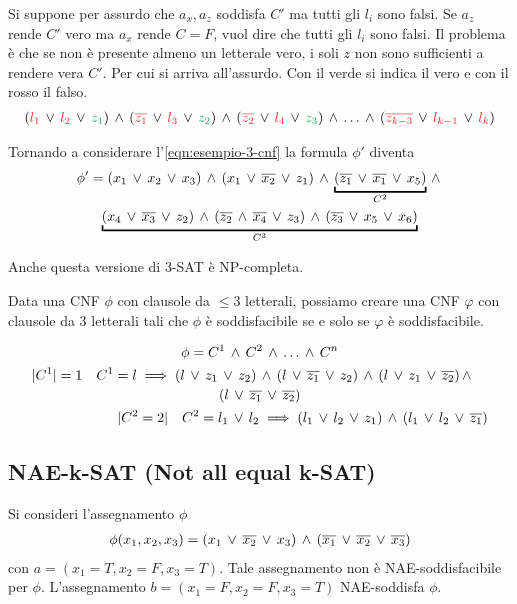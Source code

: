 Si suppone per assurdo che $a_x, a_z$ soddisfa $C'$ ma tutti gli $l_i$ sono falsi. Se $a_z$ rende $C'$ vero ma $a_x$ rende $C = F$, vuol dire che tutti gli $l_i$ sono falsi. Il problema è che se non è presente almeno un letterale vero, i soli $z$ non sono sufficienti a rendere vera $C'$. Per cui si arriva all'assurdo. Con il verde si indica il vero e con il rosso il falso.
\begin{gather*}
	(\red{l_1}\ve \red{l_2}\ve \green{z_1})\ive(\red{\overline{z_1}}\ve \red{l_3}\ve \green{z_2})\ive (\red{\overline{z_2}}\ve \red{l_4}\ve \green{z_3})\ive \dots\ive (\red{\overline{z_{k-3}}}\ve \red{l_{k-1}}\ve \red{l_k})
\end{gather*}

Tornando a considerare l'\cref{eqn:esempio-3-cnf} la formula $\phi'$ diventa
\begin{gather*}
	\phi'=(x_1\ve x_2\ve x_3)\ive(x_1\ve\overline{x_2}\ve z_1)\ive \underbracket{(\overline{z_1}\ve \overline{x_1}\ve x_5)}_{C^2}\ive\\
	\underbracket{(x_4\ve\overline{x_3}\ve z_2)\ive(\overline{z_2}\ive \overline{x_4}\ve z_3)\ive (\overline{z_3}\ve x_5\ve x_6)}_{C^3}
\end{gather*}


Anche questa versione di 3-SAT è NP-completa.
\begin{demonstration}
	Data una CNF $\phi$ con clausole da $\le 3$ letterali, possiamo creare una CNF $\varphi$ con clausole da 3 letterali tali che $\phi$ è soddisfacibile se e solo se $\varphi$ è soddisfacibile.
	
	\begin{gather*}
		\phi=C^1\ive C^2\ive\dots\ive C^n\\
		\begin{multlined}
			|C^1|=1\quad C^1=l\implies(l\ve z_1\ve z_2)\ive(l\ve\overline{z_1}\ve z_2)\ive(l\ve z_1\ve \overline{z_2})\ive\\(l\ve \overline{z_1}\ve\overline{z_2})\\
			|C^2=2|\quad C^2=l_1\ve l_2\implies (l_1\ve l_2\ve z_1)\ive (l_1\ve l_2\ve \overline{z_1})
		\end{multlined}
	\end{gather*}
\end{demonstration}
\subsection{NAE-k-SAT (Not all equal k-SAT)}
Si consideri l'assegnamento $\phi$
\begin{gather*}
	\phi(x_1,x_2,x_3)=(x_1\,\vee\, \overline{x_2}\,\vee\, x_3)\,\wedge\,(\overline{x_1}\,\vee\,\overline{x_2}\,\vee\,\overline{x_3})
\end{gather*}
con $a=(x_1=T,x_2=F,x_3=T)$. Tale assegnamento non è NAE-soddisfacibile per $\phi$. L'assegnamento $b=(x_1=F,x_2=F,x_3=T)$ NAE-soddisfa $\phi$.
